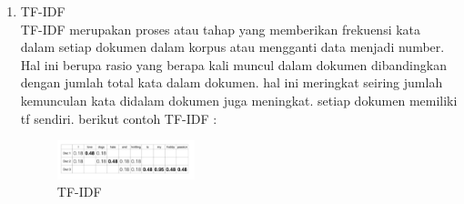 \begin{enumerate}
\item TF-IDF\\
TF-IDF merupakan proses atau tahap yang memberikan frekuensi kata dalam setiap dokumen dalam korpus atau mengganti data menjadi number. Hal ini berupa rasio yang berapa kali muncul dalam dokumen dibandingkan dengan jumlah total kata dalam dokumen. hal ini meringkat seiring jumlah kemunculan kata didalam dokumen juga meningkat. setiap dokumen memiliki tf sendiri. berikut contoh TF-IDF :
\hfill\break
	\begin{figure}[H]
		\includegraphics[width=4cm]{figures/1174053/4/5.png}
		\centering
		\caption{TF-IDF}
	\end{figure}

\end{enumerate}

